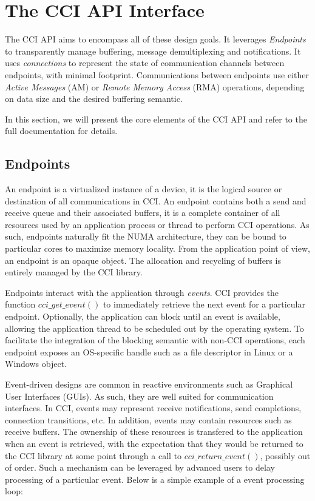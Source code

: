 \section{The CCI API Interface}
\label{sec:interface}

The CCI API aims to encompass all of these design goals. It leverages \emph{Endpoints} to transparently manage buffering, message demultiplexing and notifications. It uses \emph{connections} to represent the state of communication channels between endpoints, with minimal footprint. Communications between endpoints use either \emph{Active Messages} (AM) or \emph{Remote Memory Access} (RMA) operations, depending on data size and the desired buffering semantic. 

In this section, we will present the core elements of the CCI API and refer to the full documentation\cite{cci-api} for details.

\subsection{Endpoints}
An endpoint is a virtualized instance of a device, it is the logical source 
or destination of all communications in CCI. An endpoint contains both a send 
and receive queue and their associated buffers, it is a complete container 
of all resources used by an application process or thread to perform CCI 
operations. As such, endpoints naturally fit the NUMA architecture, they can 
be bound to particular cores to maximize memory locality. From the application 
point of view, an endpoint is an opaque object. The allocation and recycling 
of buffers is entirely managed by the CCI library.

Endpoints interact with the application through \emph{events}. CCI provides the function $cci\_get\_event()$ to immediately retrieve the next event for a particular endpoint. Optionally, the application can block until an event is available, allowing the application thread to be scheduled out by the operating system. To facilitate the integration of the blocking semantic with non-CCI operations, each endpoint exposes an OS-specific handle such as a file descriptor in Linux or a Windows object. 

Event-driven designs are common in reactive environments such as Graphical User  Interfaces (GUIs). As such, they are well suited for communication interfaces. In CCI, events may represent receive notifications, send completions, connection transitions, etc. In addition, events may contain resources such as receive buffers. The ownership of these resources is transfered to the application when an event is retrieved, with the expectation that they would be returned to the CCI library at some point through a call to $cci\_return\_event()$, possibly out of order. Such a mechanism can be leveraged by advanced users to delay processing of a particular event. Below is a simple example of a event processing loop:

